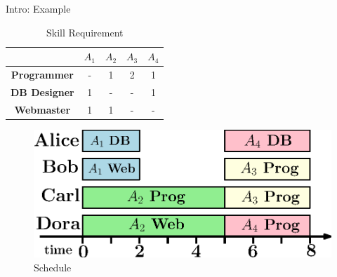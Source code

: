 \documentclass{beamer}
\begin{document}
\begin{frame}{Intro: Example}
\begin{multicols}{2}
		\begin{table}
			\caption{Skill Requirement}
			\begin{tabular}{ccccc}
				\toprule
				 & $A_1$ & $A_2$ & $A_3$ & $A_4$ \\\midrule
				{\tiny {\bf Programmer}} & - & 1 & 2 & 1 \\
				{\tiny {\bf DB Designer}} & 1 & - & - & 1 \\
				{\tiny {\bf Webmaster}} & 1 & 1 & - & - \\
				\bottomrule
			\end{tabular}
		\end{table}\pause
		\vspace{-8mm}
		\begin{figure}[H]
			\includegraphics[width=\linewidth]{images/sched.eps}
			\caption{Schedule}
		\end{figure}

	\end{multicols}
\end{frame}

\end{document}
